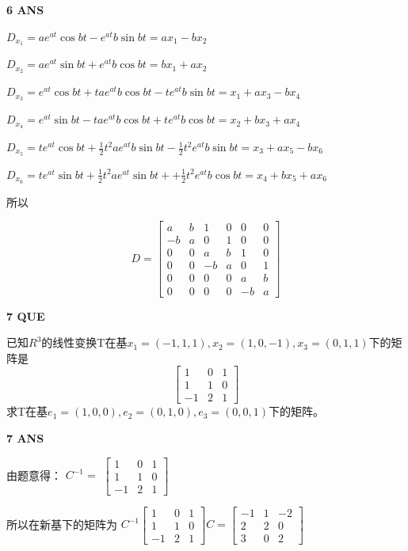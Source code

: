 \documentclass[11pt,letterpaper]{ctexart}
\begin{document}
\begin{enumerate}
\textbf{6 ANS}
\bigskip

${D_{x_1}} = ae^{at} \cos{b}t - e^{at} b\sin{b} t = ax_1 - bx_2$

${D_{x_2}} = ae^{at} \sin{b}t + e^{at} b\cos{b} t = bx_1 + ax_2$

${D_{x_3}} = e^{at} \cos{b}t + tae^{at} b\cos{b} t - te^{at} b\sin{b} t = x_1 + ax_3 -bx_4$

${D_{x_4}} = e^{at} \sin{b}t - tae^{at} b\cos{b} t + te^{at} b\cos{b} t= x_2 + bx_3 + ax_4$

${D_{x_5}} = te^{at} \cos{b}t + \frac{1}{2}t^2ae^{at} b\sin{b} t - \frac{1}{2}t^2e^{at} b\sin{b} t= x_3 + ax_5 - bx_6$

${D_{x_6}} = te^{at} \sin{b}t + \frac{1}{2}t^2ae^{at} \sin{b} t + + \frac{1}{2}t^2e^{at} b\cos{b} t = x_4 + bx_5 + ax_6$

所以


\[D = \begin{bmatrix}
    a & b & 1 & 0 & 0 & 0 \\
	-b & a & 0 & 1 & 0 & 0 \\
	0 & 0 & a & b & 1 & 0 \\
	0 & 0 & -b & a & 0 & 1 \\
	0 & 0 & 0 & 0 & a & b \\
	0 & 0 & 0 & 0 & -b & a
\end{bmatrix}\]

\textbf{7 QUE}
\bigskip

已知$R^3$的线性变换T在基$x_1 = (-1,1,1), x_2 = (1,0,-1),x_3 = (0,1,1)$下的矩阵是
\[\begin{bmatrix}
    1 & 0 & 1 \\
	1 & 1 & 0 \\
	-1 & 2 & 1
\end{bmatrix}\]
求T在基${e_1 = (1, 0, 0), e_2 = (0, 1, 0), e_3 = (0, 0, 1)}$下的矩阵。

\textbf{7 ANS}
\bigskip

由题意得：
$C^{-1} = $
$\begin{bmatrix}
    1 & 0 & 1 \\
	1 & 1 & 0 \\
	-1 & 2 & 1
\end{bmatrix}$

所以在新基下的矩阵为
$C^{-1}
\begin{bmatrix}
    1 & 0 & 1 \\
	1 & 1 & 0 \\
	-1 & 2 & 1
\end{bmatrix}C = 
\begin{bmatrix}
    -1 & 1 & -2 \\
	2 & 2 & 0 \\
	3 & 0 & 2
\end{bmatrix}
$



\end{enumerate}
\end{document}
